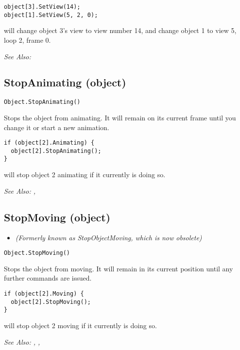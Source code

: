 \begin{verbatim}
object[3].SetView(14);
object[1].SetView(5, 2, 0);
\end{verbatim}
will change object 3's view to view number 14, and change object 1 to view 5, loop 2, frame 0.

\it{See Also:} 


\subsection{StopAnimating (object)}\label{Object.StopAnimating}%

\begin{verbatim}
Object.StopAnimating()
\end{verbatim}
Stops the object from animating. It will remain on its current frame until you change it
or start a new animation.

\begin{verbatim}
if (object[2].Animating) {
  object[2].StopAnimating();
}
\end{verbatim}
will stop object 2 animating if it currently is doing so.

\it{See Also:} ,


\subsection{StopMoving (object)}\label{Object.StopMoving}%

\begin{itemize}
\item \it{(Formerly known as StopObjectMoving, which is now obsolete)}
\end{itemize}

\begin{verbatim}
Object.StopMoving()
\end{verbatim}
Stops the object from moving. It will remain in its current position
until any further commands are issued.

\begin{verbatim}
if (object[2].Moving) {
  object[2].StopMoving();
}
\end{verbatim}
will stop object 2 moving if it currently is doing so.

\it{See Also:} , ,


